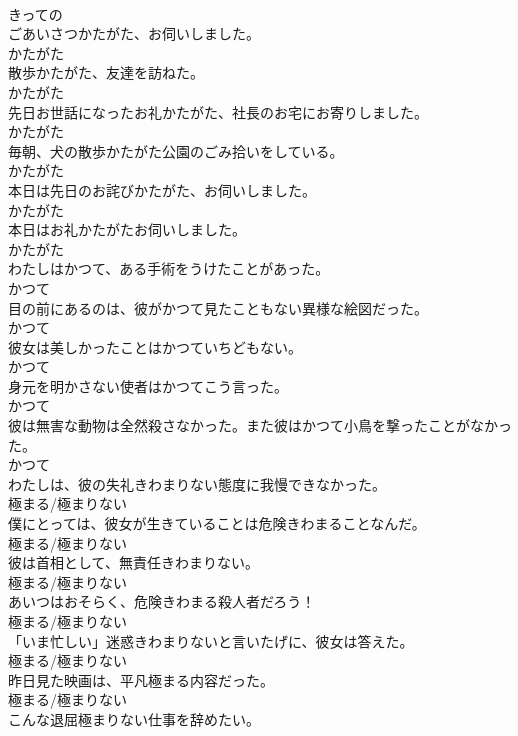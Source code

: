 \documentclass[8pt]{extreport}
\begin{document}
\begin{CJK}{UTF8}{min}
\\	きっての
\\	ごあいさつかたがた、お伺いしました。	
\\	かたがた
\\	散歩かたがた、友達を訪ねた。	
\\	かたがた
\\	先日お世話になったお礼かたがた、社長のお宅にお寄りしました。	
\\	かたがた
\\	毎朝、犬の散歩かたがた公園のごみ拾いをしている。	
\\	かたがた
\\	本日は先日のお詫びかたがた、お伺いしました。	
\\	かたがた
\\	本日はお礼かたがたお伺いしました。	
\\	かたがた
\\	わたしはかつて、ある手術をうけたことがあった。	
\\	かつて
\\	目の前にあるのは、彼がかつて見たこともない異様な絵図だった。	
\\	かつて
\\	彼女は美しかったことはかつていちどもない。	
\\	かつて
\\	身元を明かさない使者はかつてこう言った。	
\\	かつて
\\	彼は無害な動物は全然殺さなかった。また彼はかつて小鳥を撃ったことがなかった。	
\\	かつて
\\	わたしは、彼の失礼きわまりない態度に我慢できなかった。	
\\	極まる/極まりない
\\	僕にとっては、彼女が生きていることは危険きわまることなんだ。	
\\	極まる/極まりない
\\	彼は首相として、無責任きわまりない。	
\\	極まる/極まりない
\\	あいつはおそらく、危険きわまる殺人者だろう！	
\\	極まる/極まりない
\\	「いま忙しい」迷惑きわまりないと言いたげに、彼女は答えた。	
\\	極まる/極まりない
\\	昨日見た映画は、平凡極まる内容だった。	
\\	極まる/極まりない
\\	こんな退屈極まりない仕事を辞めたい。	

\end{CJK}
\end{document}
